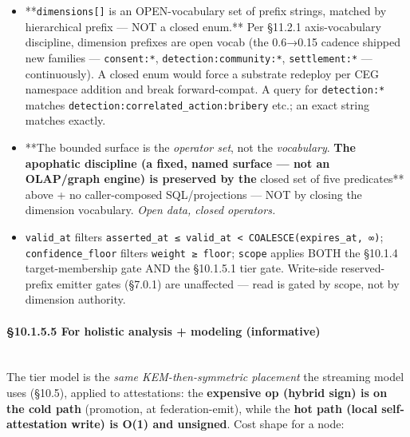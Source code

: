 \documentclass[11pt]{article}
\begin{document}
\begin{itemize}\setlength\itemsep{0pt}
\item **\texttt{dimensions[]} is an OPEN-vocabulary set of prefix strings, matched by hierarchical prefix — NOT a closed enum.** Per §11.2.1 axis-vocabulary discipline, dimension prefixes are open vocab (the 0.6→0.15 cadence shipped new families — \texttt{consent:*}, \texttt{detection:community:*}, \texttt{settlement:*} — continuously). A closed enum would force a substrate redeploy per CEG namespace addition and break forward-compat. A query for \texttt{detection:*} matches \texttt{detection:correlated\_action:bribery} etc.; an exact string matches exactly.
\item **The bounded surface is the \textit{operator set}, not the \textit{vocabulary}.\textbf{ The apophatic discipline (a fixed, named surface — not an OLAP/graph engine) is preserved by the }closed set of five predicates** above + no caller-composed SQL/projections — NOT by closing the dimension vocabulary. \textit{Open data, closed operators.}
\item \texttt{valid\_at} filters \texttt{asserted\_at ≤ valid\_at < COALESCE(expires\_at, ∞)}; \texttt{confidence\_floor} filters \texttt{weight ≥ floor}; \texttt{scope} applies BOTH the §10.1.4 target-membership gate AND the §10.1.5.1 tier gate. Write-side reserved-prefix emitter gates (§7.0.1) are unaffected — read is gated by scope, not by dimension authority.
\end{itemize}


\paragraph{§10.1.5.5 For holistic analysis + modeling (informative)}\mbox{}\\


The tier model is the \textit{same KEM-then-symmetric placement} the streaming model uses (§10.5), applied to attestations: the \textbf{expensive op (hybrid sign) is on the cold path} (promotion, at federation-emit), while the \textbf{hot path (local self-attestation write) is O(1) and unsigned}. Cost shape for a node:
\end{document}
